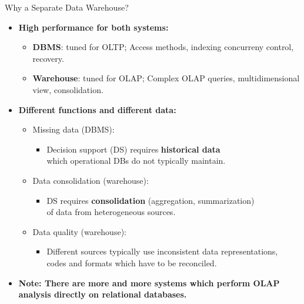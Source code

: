 \begin{frame}{Why a Separate Data Warehouse?}
  \begin{itemize}
  \item \textbf{High performance for both systems:}
    \begin{itemize}
    \item \textbf{\color{airforceblue}DBMS}: tuned for OLTP; Access methods, indexing concurreny control, recovery.
    \item \textbf{\color{airforceblue}Warehouse}: tuned for OLAP; Complex OLAP queries, multidimensional view, consolidation.
    \end{itemize}
  \item \textbf{Different functions and different data:}
    \begin{itemize}
    \item Missing data (DBMS):
      \begin{itemize}
      \item Decision support (DS) requires \textbf{\color{airforceblue}historical data} \\ which operational DBs do not typically maintain.
      \end{itemize}
    \item Data consolidation (warehouse):
      \begin{itemize}
      \item DS requires \textbf{\color{airforceblue}consolidation} (aggregation, summarization) \\
        of data from heterogeneous sources.
      \end{itemize}
    \item Data quality (warehouse):
      \begin{itemize}
      \item Different sources typically use inconsistent data representations, \\ codes and formats which have to be reconciled.
      \end{itemize}
    \end{itemize}
  \item \textbf{Note: There are more and more systems which perform OLAP\\ analysis directly on relational databases.}
  \end{itemize}
\end{frame}

